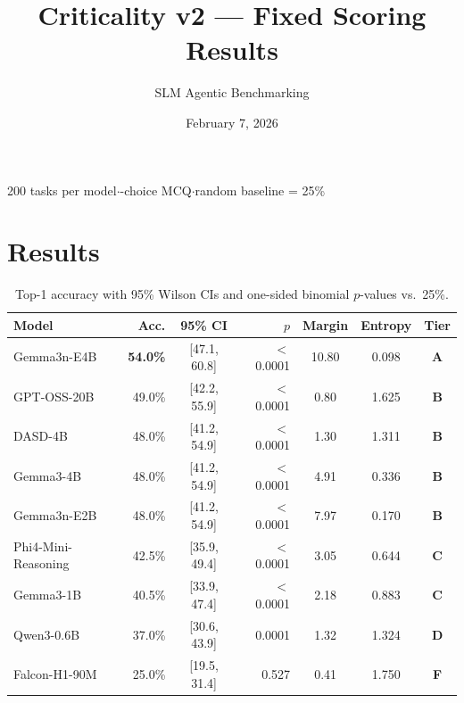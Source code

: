 \documentclass[11pt,a4paper]{article}
\title{\textbf{Criticality v2 --- Fixed Scoring Results}}
\author{SLM Agentic Benchmarking}
\date{February 7, 2026}
\begin{document}
\maketitle
\thispagestyle{empty}

\vspace{-1em}
\begin{center}
\small 200 tasks per model\enspace$\cdot$-choice MCQ\enspace$\cdot$\enspace random baseline = 25\%
\end{center}

\section{Results}

\begin{table}[h]
\centering
\caption{Top-1 accuracy with 95\% Wilson CIs and one-sided binomial $p$-values vs.\ 25\%.}
\vspace{4pt}
\begin{tabular}{@{}lrcrccc@{}}
\toprule
\textbf{Model} & \textbf{Acc.} & \textbf{95\% CI} & \textbf{$p$} & \textbf{Margin} & \textbf{Entropy} & \textbf{Tier} \\
\midrule
Gemma3n-E4B          & \textbf{54.0\%} & [47.1, 60.8] & $<$0.0001 & 10.80 & 0.098 & \textcolor{tierA}{\textbf{A}} \\
GPT-OSS-20B          & 49.0\% & [42.2, 55.9] & $<$0.0001 & 0.80 & 1.625 & \textcolor{tierB}{\textbf{B}} \\
DASD-4B              & 48.0\% & [41.2, 54.9] & $<$0.0001 & 1.30 & 1.311 & \textcolor{tierB}{\textbf{B}} \\
Gemma3-4B            & 48.0\% & [41.2, 54.9] & $<$0.0001 & 4.91 & 0.336 & \textcolor{tierB}{\textbf{B}} \\
Gemma3n-E2B          & 48.0\% & [41.2, 54.9] & $<$0.0001 & 7.97 & 0.170 & \textcolor{tierB}{\textbf{B}} \\
Phi4-Mini-Reasoning  & 42.5\% & [35.9, 49.4] & $<$0.0001 & 3.05 & 0.644 & \textcolor{tierC}{\textbf{C}} \\
Gemma3-1B            & 40.5\% & [33.9, 47.4] & $<$0.0001 & 2.18 & 0.883 & \textcolor{tierC}{\textbf{C}} \\
Qwen3-0.6B           & 37.0\% & [30.6, 43.9] & 0.0001 & 1.32 & 1.324 & \textcolor{tierD}{\textbf{D}} \\
Falcon-H1-90M        & 25.0\% & [19.5, 31.4] & 0.527 & 0.41 & 1.750 & \textcolor{tierF}{\textbf{F}} \\
\bottomrule
\end{tabular}
\label{tab:results}
\end{table}
\end{document}
